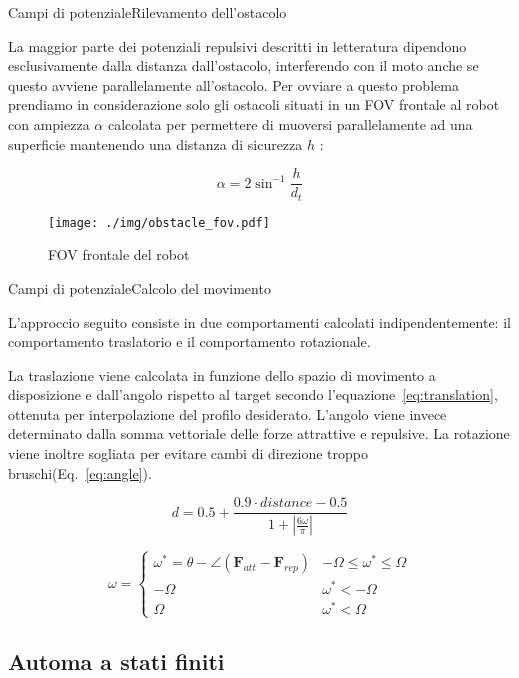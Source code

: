 \documentclass[10pt]{beamer}
\begin{document}
	\begin{frame}{Campi di potenziale}{Rilevamento dell'ostacolo}

	La maggior parte dei potenziali repulsivi descritti in letteratura
	dipendono esclusivamente dalla distanza dall'ostacolo, interferendo con il
	moto anche se questo avviene parallelamente all'ostacolo. Per ovviare a
	questo problema prendiamo in considerazione solo gli ostacoli situati in un
	FOV frontale al robot con ampiezza $ \alpha  $ calcolata per permettere di
	muoversi parallelamente ad una superficie mantenendo una distanza di
	sicurezza $ h $ : 

	\begin{equation}\label{eq:obstacle_fov}
		\alpha = {2}\sin^{-1}{\frac{h}{d_t}}
	\end{equation}

	\begin{figure}[H]
		\centering
		\texttt{[image: ./img/obstacle\_fov.pdf]}
		\caption{FOV frontale del robot}
		\label{fig:obstacle_fov}
	\end{figure}
	
	\end{frame}
	\begin{frame}{Campi di potenziale}{Calcolo del movimento}

	L'approccio seguito consiste in due comportamenti calcolati
	indipendentemente: il comportamento traslatorio e il comportamento
	rotazionale.

	La traslazione viene calcolata in funzione dello spazio di movimento a
	disposizione e dall'angolo rispetto al target secondo
	l'equazione~\ref{eq:translation}, ottenuta per interpolazione del profilo
	desiderato. L'angolo viene invece determinato dalla somma vettoriale delle
	forze attrattive e repulsive. La rotazione viene inoltre sogliata per
	evitare cambi di direzione troppo bruschi(Eq.~\ref{eq:angle}).

	\begin{equation}\label{eq:translation}
		d = 0.5 + \frac	{0.9\cdot distance - 0.5}
		{1 + \left|
				\frac{6\omega}{\pi}
		\right|  } 
	\end{equation}
	
	\begin{equation}\label{eq:angle}
		\omega = \begin{cases}
			\omega^*=\theta - \angle\left( \textbf{F}_{att} - \textbf{F}_{rep} \right)  & -\Omega \le \omega^* \le \Omega \\
			-\Omega & \omega^* < -\Omega \\
			\Omega & \omega^* < \Omega

		\end{cases}	\end{equation}
	
	\subsection{Automa a stati finiti}\label{subsec:Pianificazione}
	
	\end{frame}
\end{document}
